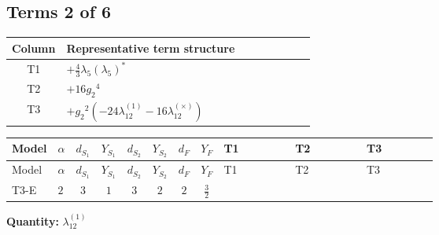 \documentclass[8pt]{article}
\begin{document}
\begin{landscape}
\subsection*{Terms 2 of 6}
\begin{center}
\begin{tabular}{@{}c >{\raggedright\arraybackslash}p{0.82\linewidth}@{}}
\toprule
Column & Representative term structure \\
\midrule
T1 & \(\displaystyle +\frac{4}{3} {\lambda_5} \left({\lambda_5}\right)^{*}\) \\
\midrule
T2 & \(\displaystyle +16 {g_2}^4\) \\
\midrule
T3 & \(\displaystyle +{g_2}^2 (-24 {\lambda_{12}^{(1)}}-16 {\lambda_{12}^{(\times)}})\) \\
\midrule
\bottomrule
\end{tabular}
\end{center}
\smallskip
\tiny
\begin{longtable}{@{}llcccccc >{\raggedright\arraybackslash}p{0.21\linewidth} >{\raggedright\arraybackslash}p{0.21\linewidth} >{\raggedright\arraybackslash}p{0.21\linewidth}@{}}
\toprule
Model & $\alpha$ & $d_{S_1}$ & $Y_{S_1}$ & $d_{S_2}$ & $Y_{S_2}$ & $d_F$ & $Y_F$ & T1 & T2 & T3 \\
\midrule
\endfirsthead
\toprule
Model & $\alpha$ & $d_{S_1}$ & $Y_{S_1}$ & $d_{S_2}$ & $Y_{S_2}$ & $d_F$ & $Y_F$ & T1 & T2 & T3 \\
\midrule
\endhead
T3-E & $2$ & $3$ & $1$ & $3$ & $2$ & $2$ & $\frac{3}{2}$ & \scriptsize\adjustbox{max width=\linewidth}{$\begin{gathered} +\frac{4}{3} {\lambda_5} \left({\lambda_5}\right)^{*}\end{gathered}$} & \scriptsize\adjustbox{max width=\linewidth}{$\begin{gathered} +16 {g_2}^4\end{gathered}$} & \scriptsize\adjustbox{max width=\linewidth}{$\begin{gathered} +{g_2}^2 (-24 {\lambda_{12}^{(1)}}-16 {\lambda_{12}^{(\times)}})\end{gathered}$} \\
\midrule
\bottomrule
\end{longtable}
\clearpage
\noindent\textbf{Quantity: }$\lambda_{12}^{(1)}$\par\smallskip

\end{landscape}
\end{document}
